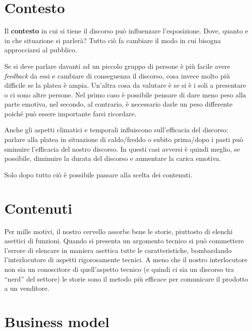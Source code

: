 \section{Contesto}

Il \textbf{contesto} in cui si tiene il discorso può influenzare l'esposizione.
Dove, quanto e in che situazione si parlerà?
Tutto ciò fa cambiare il modo in cui bisogna approcciarsi al pubblico.

Se si deve parlare davanti ad un piccolo gruppo di persone è più facile avere
\emph{feedback} da essi e cambiare di conseguenza il discorso, cosa invece
molto più difficile se la platea è ampia. Un'altra cosa da valutare è se si è
i soli a presentare o ci sono altre persone. Nel primo caso è possibile pensare
di dare meno peso alla parte emotiva, nel secondo, al contrario, è necessario
darle un peso differente poiché può essere importante farsi ricordare.

Anche gli aspetti climatici e temporali influiscono sull'efficacia del
discorso: parlare alla platea in situazione di caldo/freddo o subito prima/dopo
i pasti può sminuire l'efficacia del nostro discorso. In questi casi avversi è
quindi meglio, se possibile, diminuire la durata del discorso e aumentare la
carica emotiva.

Solo dopo tutto ciò è possibile passare alla scelta dei contenuti.

\section{Contenuti}


Per mille motivi, il nostro cervello assorbe bene le storie, piuttosto di
elenchi asettici di funzioni. Quando si presenta un argomento tecnico si può
commettere l'errore di elencare in maniera asettica tutte le caratteristiche,
bombardando l'interlocutore di aspetti rigorosamente tecnici. A meno che il
nostro interlocutore non sia un conoscitore di quell'aspetto tecnico (e quindi
ci sia un discorso tra ``nerd'' del settore) le storie sono il metodo più
efficace per comunicare il prodotto a un venditore.

\section{Business model}



